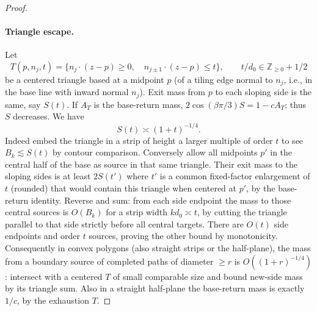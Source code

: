 \begin{proof}
\paragraph{Triangle escape.}
Let
\[
 T(p,n_j,t)=\{n_j\cdot(z-p)\ge0,\quad n_{j\pm1}\cdot(z-p)\le t\},
 \qquad t/d_0\in\mathbb Z_{\ge0}+1/2
\]
be a centered triangle based at a midpoint \(p\) (of a tiling edge normal to \(n_j\), i.e., in the base line with inward normal \(n_j\)). Exit mass from \(p\) to each sloping side is the same, say \(S(t)\). If \(A_T\) is the base-return mass, \(2\cos(\beta\pi/3)S=1-cA_T\); thus \(S\) decreases. We have
\begin{equation}\label{eq:triangle-escape}
 S(t)\asymp(1+t)^{-1/4}.
\end{equation}
Indeed embed the triangle in a strip of height a larger multiple of order \(t\) to see \(B_k\lesssim S(t)\) by contour comparison. Conversely allow all midpoints \(p'\) in the central half of the base as source in that same triangle. Their exit mass to the sloping sides is at least \(2 S(t')\) where \(t'\) is a common fixed-factor enlargement of \(t\) (rounded) that would contain this triangle when centered at \(p'\), by the base-return identity. Reverse and sum: from each side endpoint the mass to those central sources is \(O(B_k)\) for a strip width \(k d_0\asymp t\), by cutting the triangle parallel to that side strictly before all central targets. There are \(O(t)\) side endpoints and order \(t\) sources, proving the other bound by monotonicity. Consequently in convex polygons (also straight strips or the half-plane), the mass from a boundary source of completed paths of diameter \(\ge r\) is \(O((1+r)^{-1/4})\): intersect with a centered \(T\) of small comparable size and bound new-side mass by its triangle sum. Also in a straight half-plane the base-return mass is exactly \(1/c\), by the exhaustion \(T\).


\end{proof}

